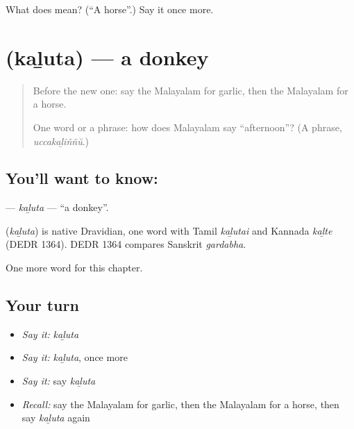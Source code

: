 \begin{tcolorbox}[breakable,colback=teal!4,colframe=teal!35!black,title={Before you move on}]
What does  mean? (\textquotedblleft{}A horse\textquotedblright{}.) Say it once more.
\end{tcolorbox}
\section[\texorpdfstring{\ml{കഴുത} (kaḻuta)}{കഴുത (kaḻuta)}]{ (kaḻuta) — a donkey}

\label{lesson:ML-C151-kaluta}



\begin{quote}
Before the new one: say the Malayalam for garlic, then the Malayalam for a horse.

One word or a phrase: how does Malayalam say \textquotedblleft{}afternoon\textquotedblright{}? (A phrase, \emph{uccakaḻiññŭ}.)
\end{quote}

\subsection*{You'll want to know: }
\textbf{} — \emph{kaḻuta} — \textquotedblleft{}a donkey\textquotedblright{}.

\begin{cousinweb}
\textbf{} (\emph{kaḻuta}) is native Dravidian, one word with Tamil \emph{kaḻutai} and Kannada \emph{kaḻte} (DEDR 1364). DEDR 1364 compares Sanskrit \emph{gardabha}.
\end{cousinweb}

\begin{grammarlens}[title={What you've built}]
One more word for this chapter.
\end{grammarlens}

\subsection*{Your turn}
\begin{itemize}
\raggedright
  \item \emph{Say it:} \emph{kaḻuta}
  \item \emph{Say it:} \emph{kaḻuta}, once more
  \item \emph{Say it:} say \emph{kaḻuta}
  \item \emph{Recall:} say the Malayalam for garlic, then the Malayalam for a horse, then say \emph{kaḻuta} again
\end{itemize}

